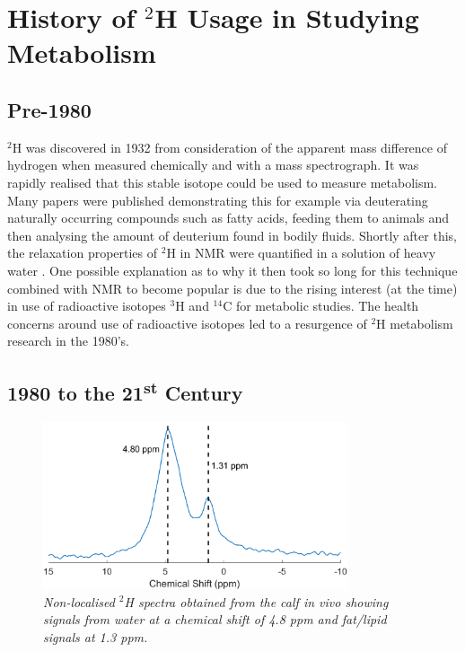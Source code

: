 \section{History of $^2$H Usage in Studying Metabolism}

\subsection{Pre-1980}

$^2$H was discovered in 1932 \cite{Urey1932AConcentration} from consideration of the apparent mass difference of hydrogen when measured chemically and with a mass spectrograph. It was rapidly realised that this stable isotope could be used to measure metabolism. Many papers were published demonstrating this \cite{Schoenheimer1935DeuteriumMetabolism,Schoenheimer1938TheMetabolism} for example via deuterating naturally occurring compounds such as fatty acids, feeding them to animals and then analysing the amount of deuterium found in bodily fluids. Shortly after this, the relaxation properties of $^2$H in \ac{NMR} were quantified in a solution of heavy water \cite{Bloembergen1948RelaxationAbsorption}. One possible explanation as to why it then took so long for this technique combined with \ac{NMR} to become popular is due to the rising interest (at the time) \cite{DeFeyter2021DeuteriumFuture} in use of radioactive isotopes $^3$H \cite{Thompson1953StudiesRat} and $^{14}$C \cite{Turteltaub1990AcceleratorDNA.} for metabolic studies. The health concerns around use of radioactive isotopes led to a resurgence of $^2$H metabolism research in the 1980's.

\subsection{1980 to the 21\textsuperscript{st} Century}


\begin{figure}
    \centering
    \includegraphics[width=0.8\textwidth]{Figures/Intro/NA_Spectra.png}
    \caption{\textit{Non-localised $^2$H spectra obtained from the calf \textit{in vivo} showing signals from water at a chemical shift of 4.8 ppm and fat/lipid signals at 1.3 ppm.}}
    \label{fig:intro:NA}
\end{figure}


